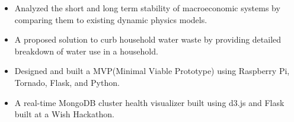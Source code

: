 \documentclass[10pt,a4paper,academicons]{altacv}
\begin{document}
\begin{itemize}
\item Analyzed the short and long term stability of macroeconomic systems by
    comparing them to existing dynamic physics models.
\end{itemize}


\begin{itemize}
\item A proposed solution to curb household water waste by providing detailed breakdown of water use in a household.
\item Designed and built a MVP(Minimal Viable Prototype) using Raspberry Pi, Tornado, Flask, and Python.
\end{itemize}
\divider

\begin{itemize}
\item A real-time MongoDB cluster health visualizer built using d3.js and Flask
    built at a Wish Hackathon.
\end{itemize}
\end{document}
